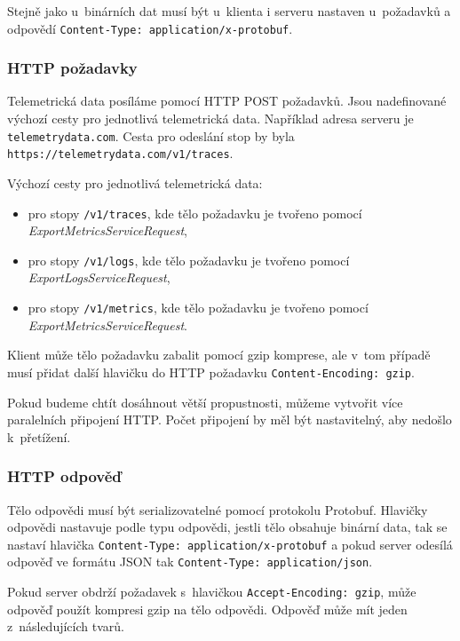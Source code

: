 Stejně jako u~binárních dat musí být u~klienta i serveru nastaven u~požadavků a odpovědí \texttt{Content-Type: application/x-protobuf}.

\subsubsection{HTTP požadavky}
Telemetrická data posíláme pomocí HTTP POST požadavků. Jsou nadefinované výchozí cesty pro jednotlivá telemetrická data. Například adresa serveru je \texttt{telemetrydata.com}. Cesta pro odeslání stop by byla \texttt{https://telemetrydata.com/v1/traces}. 

Výchozí cesty pro jednotlivá telemetrická data:
\begin{itemize}
        \item{pro stopy \texttt{/v1/traces}, kde tělo požadavku je tvořeno pomocí \textit{ExportMetricsServiceRequest},}
        \item{pro stopy \texttt{/v1/logs}, kde tělo požadavku je tvořeno pomocí \textit{ExportLogsServiceRequest},}
        \item{pro stopy \texttt{/v1/metrics}, kde tělo požadavku je tvořeno pomocí \textit{ExportMetricsServiceRequest}.}
\end{itemize}

Klient může tělo požadavku zabalit pomocí gzip komprese, ale v~tom případě musí přidat další hlavičku do HTTP požadavku \texttt{Content-Encoding: gzip}.

Pokud budeme chtít dosáhnout větší propustnosti, můžeme vytvořit více paralelních připojení HTTP. Počet připojení by měl být nastavitelný, aby nedošlo k~přetížení.


\subsubsection{HTTP odpověď}

Tělo odpovědi musí být serializovatelné pomocí protokolu Protobuf. Hlavičky odpovědi nastavuje podle typu odpovědi, jestli tělo obsahuje binární data, tak se nastaví hlavička \texttt{Content-Type: application/x-protobuf} a pokud server odesílá odpověď ve formátu JSON tak \texttt{Content-Type: application/json}. 

Pokud server obdrží požadavek s~hlavičkou \texttt{Accept-Encoding: gzip}, může odpověď použít kompresi gzip na tělo odpovědi. Odpověď může mít jeden z~následujících tvarů.

